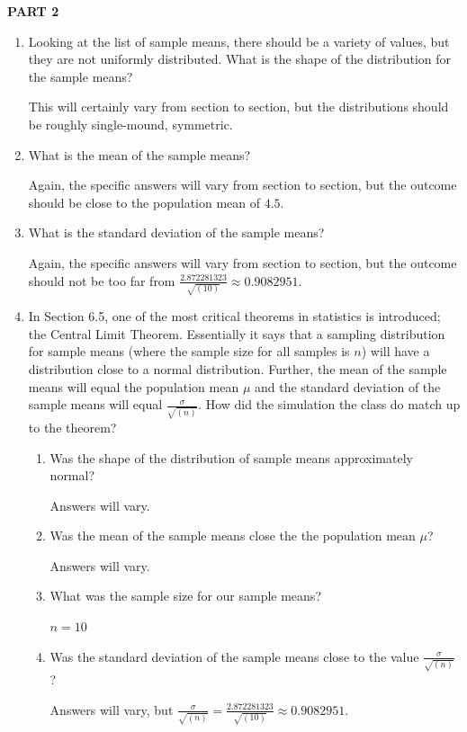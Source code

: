 \documentclass{article}
\newcommand{\answer}[1]{\color{red}#1}
\begin{document}
\textbf{PART 2}

\begin{enumerate}

\item Looking at the list of sample means, there should be a variety of values, but they are not uniformly distributed. What is the shape of the distribution for the sample means?

{\answer This will certainly vary from section to section, but the distributions should be roughly single-mound, symmetric.
} 

\item What is the mean of the sample means? 

{\answer Again, the specific answers will vary from section to section, but the outcome should be close to the population mean of $4.5$.
} 

\item What is the standard deviation of the sample means? 

{\answer Again, the specific answers will vary from section to section, but the outcome should not be too far from $\frac{2.872281323}{\sqrt{(10)}} \approx 0.9082951$.
} 

\item In Section 6.5, one of the most critical theorems in statistics is introduced; the Central Limit Theorem. Essentially it says that a sampling distribution for sample means (where the sample size for all samples is $n$) will have a distribution close to a normal distribution. Further, the mean of the sample means will equal the population mean $\mu$ and the standard deviation of the sample means will equal $\frac{\sigma}{\sqrt{(n)}}$. How did the simulation the class do match up to the theorem? 

	\begin{enumerate}
	
	\item Was the shape of the distribution of sample means approximately normal? 
	
	{\answer Answers will vary.
	} 
	
	\item Was the mean of the sample means close the the population mean $\mu$? 
	
	{\answer Answers will vary.
	} 
	
	\item What was the sample size for our sample means? 
	
	{\answer $n = 10$ 
	} 
	
	\item Was the standard deviation of the sample means close to the value $\frac{\sigma}{\sqrt{(n)}}$? 
	
	{\answer Answers will vary, but $\frac{\sigma}{\sqrt{(n)}} = \frac{2.872281323}{\sqrt{(10)}} \approx 0.9082951$.
	} 
	
	\end{enumerate}
	

\end{enumerate}
\end{document}
